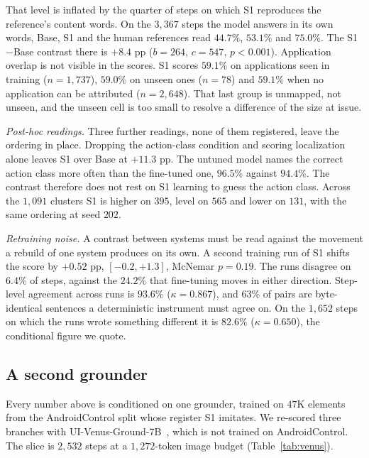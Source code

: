 \documentclass[conference]{IEEEtran}
\begin{document}
That level is inflated by the quarter of steps on which S1 reproduces the reference's content
words. On the $3{,}367$ steps the model answers in its own words, Base, S1 and the human
references read $44.7\%$, $53.1\%$ and $75.0\%$. The S1$-$Base contrast there is $+8.4$ pp
($b = 264$, $c = 547$, $p<0.001$). Application overlap is not visible in the scores. S1
scores $59.1\%$ on applications seen in training ($n{=}1{,}737$), $59.0\%$ on unseen ones
($n{=}78$) and $59.1\%$ when no application can be attributed ($n{=}2{,}648$). That last
group is unmapped, not unseen, and the unseen cell is too small to resolve a difference of
the size at issue.

\emph{Post-hoc readings.} Three further readings, none of them registered, leave the ordering
in place. Dropping the action-class condition and scoring localization alone leaves S1 over
Base at $+11.3$ pp. The untuned model names the correct action class more often than the
fine-tuned one, $96.5\%$ against $94.4\%$. The contrast therefore does not rest on S1 learning
to guess the action class. Across the $1{,}091$ clusters S1 is higher on $395$, level on $565$
and lower on $131$, with the same ordering at seed $202$.

\emph{Retraining noise.} A contrast between systems must be read against the movement a rebuild of
one system produces on its own. A second training run of S1 shifts the score by $+0.52$ pp, $[-0.2, +1.3]$,
McNemar $p = 0.19$. The runs disagree on $6.4\%$ of steps, against the $24.2\%$ that
fine-tuning moves in either direction. Step-level agreement across runs is $93.6\%$
($\kappa = 0.867$), and $63\%$ of pairs are byte-identical sentences a deterministic
instrument must agree on. On the $1{,}652$ steps on which the runs wrote something different it
is $82.6\%$ ($\kappa = 0.650$), the conditional figure we quote.

\subsection{A second grounder}
\label{sec:venus}
Every number above is conditioned on one grounder, trained on $47$K elements from the
AndroidControl split whose register S1 imitates. We re-scored three branches with
UI-Venus-Ground-7B~\cite{uivenus}, which is not trained on AndroidControl. The slice is $2{,}532$ steps at a
$1{,}272$-token image budget (Table~\ref{tab:venus}).
\end{document}

